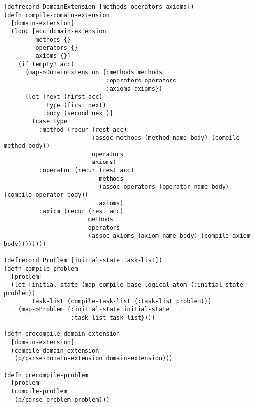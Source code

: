 \begin{lstlisting}
(defrecord DomainExtension [methods operators axioms])
(defn compile-domain-extension
  [domain-extension]
  (loop [acc domain-extension
         methods {}
         operators {}
         axioms {}]
    (if (empty? acc)
      (map->DomainExtension {:methods methods
                             :operators operators
                             :axioms axioms})
      (let [next (first acc)
            type (first next)
            body (second next)]
        (case type
          :method (recur (rest acc)
                         (assoc methods (method-name body) (compile-method body))
                         operators
                         axioms)
          :operator (recur (rest acc)
                           methods
                           (assoc operators (operator-name body) (compile-operator body))
                           axioms)
          :axiom (recur (rest acc)
                        methods
                        operators
                        (assoc axioms (axiom-name body) (compile-axiom body))))))))

(defrecord Problem [initial-state task-list])
(defn compile-problem
  [problem]
  (let [initial-state (map compile-base-logical-atom (:initial-state problem))
        task-list (compile-task-list (:task-list problem))]
    (map->Problem {:initial-state initial-state
                   :task-list task-list})))

(defn precompile-domain-extension
  [domain-extension]
  (compile-domain-extension
   (p/parse-domain-extension domain-extension)))

(defn precompile-problem
  [problem]
  (compile-problem
   (p/parse-problem problem)))
\end{lstlisting}

